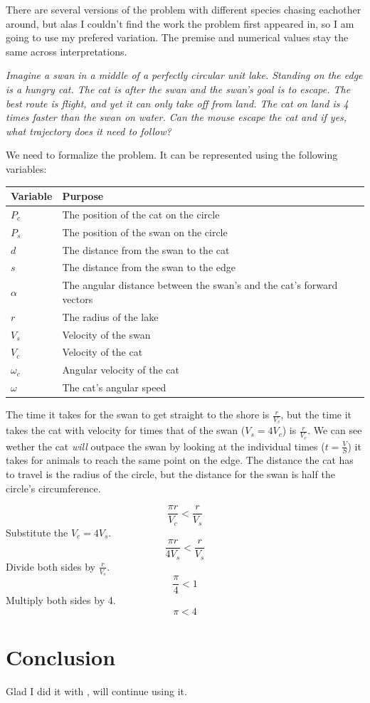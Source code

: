 \documentclass[12pt]{article}
\begin{document}
There are several versions of the problem with different species chasing eachother around, but alas I couldn't find the work the problem first appeared in, so I am going to use my prefered variation. The premise and numerical values stay the same across interpretations.

\newpage
\emph{Imagine a swan in a middle of a perfectly circular unit lake. Standing on the edge is a hungry cat. The cat is after the swan and the swan's goal is to escape. The best route is flight, and yet it can only take off from land. The cat on land is 4 times faster than the swan on water. Can the mouse escape the cat and if yes, what trajectory does it need to follow?}

We need to formalize the problem. It can be represented using the following variables:

\begin{tabular}{|l|l|}
\hline
\textbf{Variable} & \textbf{Purpose}\\
\hline
$P_c$ & The position of the cat on the circle\\
$P_s$ & The position of the swan on the circle\\
$d$ & The distance from the swan to the cat\\
$s$ & The distance from the swan to the edge\\
$\alpha$ & The angular distance between the swan's and the cat's forward vectors\\
$r$ & The radius of the lake\\
$V_s$ & Velocity of the swan\\
$V_c$ & Velocity of the cat\\
$\omega_c$ & Angular velocity of the cat\\
$\omega$ & The cat's angular speed\\
\hline
\end{tabular}

The time it takes for the swan to get straight to the shore is $\frac{r}{V_s}$, but the time it takes the cat with velocity for times that of the swan ($V_s = 4V_c$) is $\frac{r}{V_c}$. We can see wether the cat \emph{will} outpace the swan by looking at the individual times ($t = \frac{V}{S}$) it takes for animals to reach the same point on the edge. The distance the cat has to travel is the radius of the circle, but the distance for the swan is half the circle's circumference.

\begin{equation}
	\frac{\pi r}{V_c} < \frac{r}{V_s}
\end{equation}
Substitute the $V_c = 4V_s$.
\begin{equation}
	\frac{\pi r}{4V_s} < \frac{r}{V_s}
\end{equation}
Divide both sides by $\frac{r}{V_s}$.
\begin{equation}
	\frac{\pi}{4} < 1
\end{equation}
Multiply both sides by 4.
\begin{equation}
	\pi < 4
\end{equation}



\section{Conclusion}
Glad I did it with \LaTeXe\cite{latex2e}, will continue using it.

\clearpage


\end{document}
